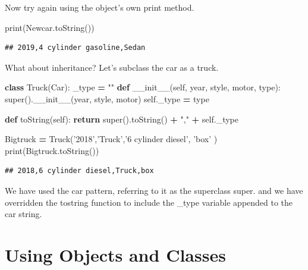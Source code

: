 \documentclass[]{book}
\newenvironment{Shaded}{\begin{snugshade}}{\end{snugshade}}
\newcommand{\KeywordTok}[1]{\textcolor[rgb]{0.13,0.29,0.53}{\textbf{#1}}}
\newcommand{\StringTok}[1]{\textcolor[rgb]{0.31,0.60,0.02}{#1}}
\newcommand{\FunctionTok}[1]{\textcolor[rgb]{0.00,0.00,0.00}{#1}}
\newcommand{\VariableTok}[1]{\textcolor[rgb]{0.00,0.00,0.00}{#1}}
\newcommand{\ControlFlowTok}[1]{\textcolor[rgb]{0.13,0.29,0.53}{\textbf{#1}}}
\newcommand{\OperatorTok}[1]{\textcolor[rgb]{0.81,0.36,0.00}{\textbf{#1}}}
\newcommand{\BuiltInTok}[1]{#1}
\newcommand{\NormalTok}[1]{#1}
\theoremstyle{definition}
\theoremstyle{definition}
\theoremstyle{definition}
\theoremstyle{remark}
\begin{document}
Now try again using the object's own print method.

\begin{Shaded}
\begin{Highlighting}[]
\BuiltInTok{print}\NormalTok{(Newcar.toString())}
\end{Highlighting}
\end{Shaded}

\begin{verbatim}
## 2019,4 cylinder gasoline,Sedan
\end{verbatim}

What about inheritance? Let's subclass the car as a truck.

\begin{Shaded}
\begin{Highlighting}[]
\KeywordTok{class}\NormalTok{ Truck(Car):}
\NormalTok{    _type }\OperatorTok{=} \StringTok{""}
    \KeywordTok{def} \FunctionTok{__init__}\NormalTok{(}\VariableTok{self}\NormalTok{, year, style, motor, }\BuiltInTok{type}\NormalTok{):}
        \BuiltInTok{super}\NormalTok{().}\FunctionTok{__init__}\NormalTok{(year, style, motor)}
        \VariableTok{self}\NormalTok{._type }\OperatorTok{=} \BuiltInTok{type}
   
    \KeywordTok{def}\NormalTok{ toString(}\VariableTok{self}\NormalTok{):}
        \ControlFlowTok{return} \BuiltInTok{super}\NormalTok{().toString() }\OperatorTok{+} \StringTok{","} \OperatorTok{+} \VariableTok{self}\NormalTok{._type}
        
\NormalTok{Bigtruck }\OperatorTok{=}\NormalTok{ Truck(}\StringTok{'2018'}\NormalTok{,}\StringTok{'Truck'}\NormalTok{,}\StringTok{'6 cylinder diesel'}\NormalTok{, }\StringTok{'box'}\NormalTok{ )}
\BuiltInTok{print}\NormalTok{(Bigtruck.toString())}
\end{Highlighting}
\end{Shaded}

\begin{verbatim}
## 2018,6 cylinder diesel,Truck,box
\end{verbatim}

We have used the car pattern, referring to it as the superclass super.
and we have overridden the tostring function to include the \_type
variable appended to the car string.

\section{Using Objects and Classes}\label{using-objects-and-classes}
\end{document}
